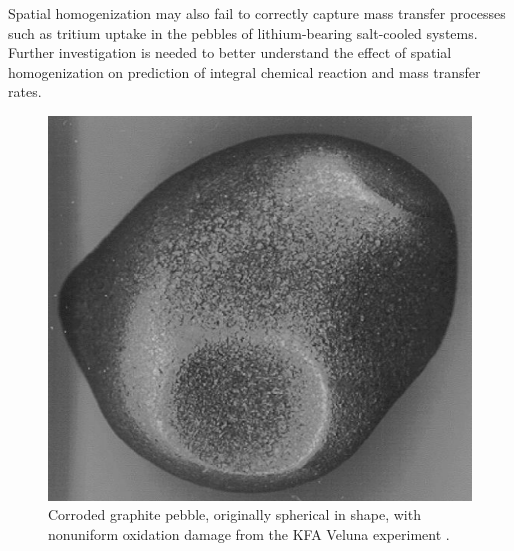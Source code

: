 Spatial homogenization may also fail to correctly capture mass transfer processes such as tritium uptake in the pebbles of lithium-bearing salt-cooled systems. Further investigation is needed to better understand the effect of spatial homogenization on prediction of integral chemical reaction and mass transfer rates.


\begin{figure}[!h]
\centering
\includegraphics[width=0.4\linewidth]{figs/corroded_pebble.png}
\caption{Corroded graphite pebble, originally spherical in shape, with nonuniform oxidation damage from the KFA Veluna experiment \cite{hassan_mev}.}
\label{fig:corroded_pebble}
\end{figure}



